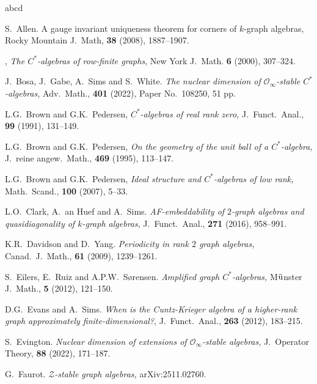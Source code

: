 \documentclass[12pt]{amsart}
\theoremstyle{plain}
\theoremstyle{definition}
\theoremstyle{remark}
\begin{document}
\begin{thebibliography}{abcd}

 S.\  Allen. {A gauge invariant uniqueness theorem for corners of $k$-graph algebras,} Rocky Mountain J.\  Math, \textbf{38} (2008),  1887--1907.

, \textit{The $C^{\ast}$-algebras of row-finite graphs}, New York J.\ Math. {\bf 6} (2000), 307--324.

 J.\ Bosa, J.\ Gabe, A.\ Sims and S.\ White. \emph{The nuclear dimension of $\mathcal O_\infty$-stable $C^*$-algebras,} Adv.\ Math., \textbf{401} (2022), Paper No.\ 108250, 51 pp.

 L.G.\ Brown and G.K.\ Pedersen, \emph{$C^*$-algebras of real rank zero,} J.\ Funct.\ Anal., \textbf{99} (1991), 131--149.


 L.G.\ Brown and G.K.\ Pedersen, \emph{On the geometry of the unit ball of a $C^*$-algebra,} J.\ reine angew.\ Math., \textbf{469} (1995), 113--147.

 L.G.\ Brown and G.K.\ Pedersen, \emph{Ideal structure and $C^*$-algebras of low rank,} Math.\ Scand., \textbf{100} (2007),  5--33.

 L.O.\ Clark, A.\ an Huef and A.\ Sims. \emph{AF-embeddability of $2$-graph algebras and quasidiagonality of $k$-graph algebras}, J.\  Funct.\ Anal.,
\textbf{271} (2016),  958--991.

 K.R.\ Davidson and D.\ Yang. \emph{Periodicity in rank $2$ graph algebras,} Canad.\ J.\ Math., \textbf{61} (2009), 1239--1261.

  S.\  Eilers,  E.\ Ruiz and A.P.W.\ S\o rensen. \emph{Amplified graph $C^*$-algebras,} M$\ddot{\rm u}$nster J.\ Math., \textbf{5} (2012), 121--150.

 D.G.\ Evans  and A.\ Sims.
\emph{When is the {C}untz-{K}rieger algebra of a higher-rank graph approximately finite-dimensional?}, J.\ Funct.\ Anal.,
\textbf{263} (2012), 183--215.

 S.\ Evington. \emph{Nuclear dimension of extensions of $\mathcal O_\infty$-stable algebras,} J.\ Operator Theory, \textbf{88} (2022), 171--187.

 G.\ Faurot. \emph{$\mathcal Z$-stable graph algebras,} arXiv:2511.02760.


\end{thebibliography}
\end{document}

